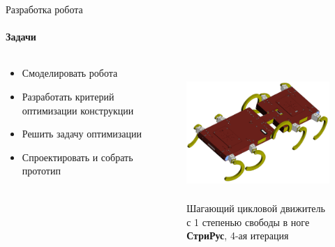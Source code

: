 \documentclass[aspectratio=169,xcolor=table]{beamer}
\begin{document}
\begin{frame}[t]{Разработка робота}
    \framesubtitle{Задачи}
    \large
    \vspace{-0.5cm}
    \begin{columns}[T,onlytextwidth]
        \begin{column}{0.49\textwidth}
            \begin{itemize}
                \item Смоделировать робота
                \item Разработать критерий оптимизации конструкции
                \item Решить задачу оптимизации
                \item Спроектировать и собрать прототип
            \end{itemize}
        \end{column}
        \begin{column}{0.49\textwidth}
            \vspace{-1.1cm}
            \begin{figure}[H]
                \centering\includegraphics[height=5cm,width=1\textwidth,keepaspectratio]{strirus_4.png}
                \caption*{Шагающий цикловой движитель с 1 степенью свободы в ноге \\ \textbf{СтриРус}, 4-ая итерация}
                \label{fig:strirus_4.png}
            \end{figure}
        \end{column}
    \end{columns}
\end{frame}
\end{document}

